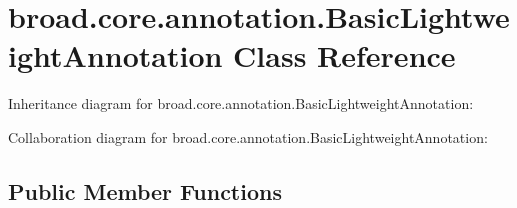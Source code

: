 \hypertarget{classbroad_1_1core_1_1annotation_1_1_basic_lightweight_annotation}{\section{broad.\+core.\+annotation.\+Basic\+Lightweight\+Annotation Class Reference}
\label{classbroad_1_1core_1_1annotation_1_1_basic_lightweight_annotation}
}


Inheritance diagram for broad.\+core.\+annotation.\+Basic\+Lightweight\+Annotation\+:


Collaboration diagram for broad.\+core.\+annotation.\+Basic\+Lightweight\+Annotation\+:
\subsection*{Public Member Functions}
